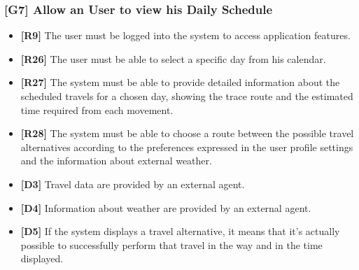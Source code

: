 \subsubsection{[G7] Allow an User to view his Daily Schedule}
\begin{itemize}
	\item \textbf{[R9]} The user must be logged into the system to access application features.
	\item \textbf{[R26]} The user must be able to select a specific day from his calendar.
	\item \textbf{[R27]} The system must be able to provide detailed information about the scheduled travels for a chosen day, showing the trace route and the estimated time required from each movement.
	\item \textbf{[R28]} The system must be able to choose a route between the possible travel alternatives according to the preferences expressed in the user profile settings and the information about external weather.
	\item \textbf{[D3]} Travel data are provided by an external agent.
	\item \textbf{[D4]} Information about weather are provided by an external agent.
	\item \textbf{[D5]} If the system displays a travel alternative, it means that it’s actually possible to successfully perform that travel in the way and in the time displayed.
	
\end{itemize}
